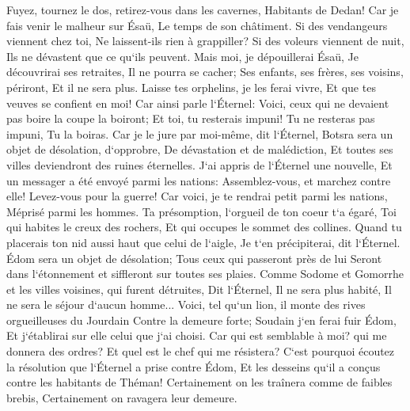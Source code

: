 \verse Fuyez, tournez le dos, retirez-vous dans les cavernes, Habitants de Dedan! Car je fais venir le malheur sur Ésaü, Le temps de son châtiment. 
\verse Si des vendangeurs viennent chez toi, Ne laissent-ils rien à grappiller? Si des voleurs viennent de nuit, Ils ne dévastent que ce qu`ils peuvent. 
\verse Mais moi, je dépouillerai Ésaü, Je découvrirai ses retraites, Il ne pourra se cacher; Ses enfants, ses frères, ses voisins, périront, Et il ne sera plus. 
\verse Laisse tes orphelins, je les ferai vivre, Et que tes veuves se confient en moi! 
\verse Car ainsi parle l`Éternel: Voici, ceux qui ne devaient pas boire la coupe la boiront; Et toi, tu resterais impuni! Tu ne resteras pas impuni, Tu la boiras. 
\verse Car je le jure par moi-même, dit l`Éternel, Botsra sera un objet de désolation, d`opprobre, De dévastation et de malédiction, Et toutes ses villes deviendront des ruines éternelles. 
\verse J`ai appris de l`Éternel une nouvelle, Et un messager a été envoyé parmi les nations: Assemblez-vous, et marchez contre elle! Levez-vous pour la guerre! 
\verse Car voici, je te rendrai petit parmi les nations, Méprisé parmi les hommes. 
\verse Ta présomption, l`orgueil de ton coeur t`a égaré, Toi qui habites le creux des rochers, Et qui occupes le sommet des collines. Quand tu placerais ton nid aussi haut que celui de l`aigle, Je t`en précipiterai, dit l`Éternel. 
\verse Édom sera un objet de désolation; Tous ceux qui passeront près de lui Seront dans l`étonnement et siffleront sur toutes ses plaies. 
\verse Comme Sodome et Gomorrhe et les villes voisines, qui furent détruites, Dit l`Éternel, Il ne sera plus habité, Il ne sera le séjour d`aucun homme... 
\verse Voici, tel qu`un lion, il monte des rives orgueilleuses du Jourdain Contre la demeure forte; Soudain j`en ferai fuir Édom, Et j`établirai sur elle celui que j`ai choisi. Car qui est semblable à moi? qui me donnera des ordres? Et quel est le chef qui me résistera? 
\verse C`est pourquoi écoutez la résolution que l`Éternel a prise contre Édom, Et les desseins qu`il a conçus contre les habitants de Théman! Certainement on les traînera comme de faibles brebis, Certainement on ravagera leur demeure. 
